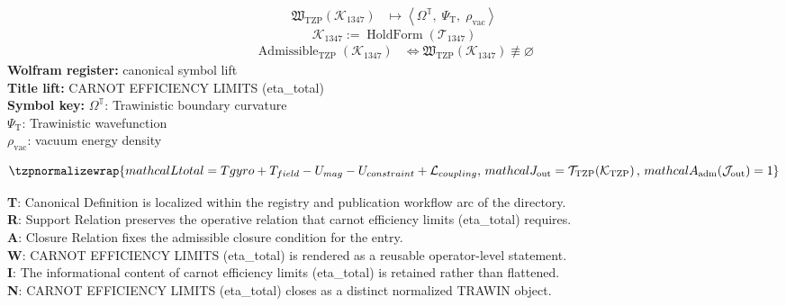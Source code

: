 \noindent
\begin{minipage}[t]{0.48\linewidth}
\begingroup
\small
\[
\begin{aligned}
\mathfrak{W}_{\mathrm{TZP}}\!\left(\mathcal{K}_{1347}\right)
&\longmapsto
\left\langle \Omega^{\mathbb{T}},\; \Psi_{\mathrm{T}},\; \rho_{\mathrm{vac}} \right\rangle
\end{aligned}
\]
\[
\mathcal{K}_{1347}
:=
\operatorname{HoldForm}\!\left(\mathcal{T}_{1347}\right)
\]
\[
\begin{aligned}
\operatorname{Admissible}_{\mathrm{TZP}}\!\left(\mathcal{K}_{1347}\right)
&\Longleftrightarrow
\mathfrak{W}_{\mathrm{TZP}}\!\left(\mathcal{K}_{1347}\right)\not\equiv\varnothing
\end{aligned}
\]
\textbf{Wolfram register:} canonical symbol lift\\
\textbf{Title lift:} CARNOT EFFICIENCY LIMITS (eta\_total)\\
\textbf{Symbol key:} \(\Omega^{\mathbb{T}}\): Trawinistic boundary curvature\\ \(\Psi_{\mathrm{T}}\): Trawinistic wavefunction\\ \(\rho_{\mathrm{vac}}\): vacuum energy density
\par
\endgroup
\end{minipage}\hfill
\begin{minipage}[t]{0.48\linewidth}
\[
\tzpnormalizewrap{mathcal{L} {total} = T {gyro} + T_{field} - U_{mag} - U_{constraint} + \mathcal{L}_{coupling},\,mathcal{J}_{\mathrm{out}} = \mathcal{T}_{\mathrm{TZP}}\!\left(\mathcal{K}_{\mathrm{TZP}}\right),\,mathcal{A}_{\mathrm{adm}}\!\left(\mathcal{J}_{\mathrm{out}}\right)=1}
\]

\small
\textbf{T}: Canonical Definition is localized within the registry and publication workflow arc of the directory.\\
\textbf{R}: Support Relation preserves the operative relation that carnot efficiency limits (eta\_total) requires.\\
\textbf{A}: Closure Relation fixes the admissible closure condition for the entry.\\
\textbf{W}: CARNOT EFFICIENCY LIMITS (eta\_total) is rendered as a reusable operator-level statement.\\
\textbf{I}: The informational content of carnot efficiency limits (eta\_total) is retained rather than flattened.\\
\textbf{N}: CARNOT EFFICIENCY LIMITS (eta\_total) closes as a distinct normalized TRAWIN object.
\normalsize
\end{minipage}

